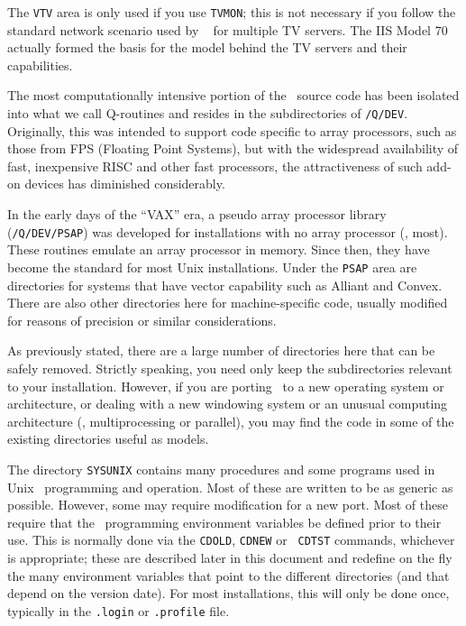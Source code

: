 \noindent The {\tt VTV} area is only used if you use {\tt TVMON}; this
is not necessary if you follow the standard network scenario used by
\AIPS~ for multiple TV servers.  The IIS Model 70 actually formed the
basis for the model behind the TV servers and their capabilities.
\medskip


The most computationally intensive portion of the \AIPS\ source code has
been isolated into what we call Q-routines and resides in the
subdirectories of {\tt \thisver/Q/DEV}.  Originally, this was intended to
support code specific to array processors, such as those from FPS
(Floating Point Systems), but with the widespread availability of fast,
inexpensive RISC and other fast processors, the attractiveness of such
add-on devices has diminished considerably.

In the early days of the ``VAX'' era, a pseudo array processor library
({\tt \thisver/Q/DEV/PSAP}) was developed for installations with no
array processor (\ie, most).  These routines emulate an array processor
in memory.  Since then, they have become the standard for most Unix
installations.  Under the {\tt PSAP} area are directories for systems
that have vector capability such as Alliant and Convex.  There are also
other directories here for machine-specific code, usually modified for
reasons of precision or similar considerations.

As previously stated, there are a large number of directories here that
can be safely removed.  Strictly speaking, you need only keep the
subdirectories relevant to your installation.  However, if you are porting
\AIPS\ to a new operating system or architecture, or dealing with a new
windowing system or an unusual computing architecture (\eg,
multiprocessing or parallel), you may find the code in some of the
existing directories useful as models.

\medskip{}

The directory {\tt \dol SYSUNIX} contains many procedures and some programs
used in Unix \AIPS\ programming and operation.  Most of these are
written to be as generic as possible.  However, some may require
modification for a new port.  Most of these require that the
\AIPS\ programming environment variables be defined prior to their use.
This is normally done via the {\tt \dol CDOLD}, {\tt \dol CDNEW} or {\tt
\dol CDTST} commands, whichever is appropriate; these are described later
in this document and redefine on the fly the many environment variables
that point to the different directories (and that depend on the version
date).  For most installations, this will only be done once, typically in
the {\tt .login} or {\tt .profile} file.

